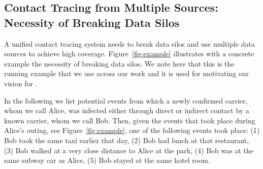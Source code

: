 \subsection{Contact Tracing from Multiple Sources: Necessity of Breaking Data Silos}
\label{bds}

A unified contact tracing system needs to break data silos and use multiple data sources to achieve high coverage. Figure~\ref{fig:example} illustrates with a concrete example the necessity of breaking data silos. We note here that this is the running example that we use across our work and it is used for motivating our vision for \sysname.

\begin{figure*}[t!]
	\centering
	\caption{Real-world example of contact tracing based on Alice's outing.}
	\label{fig:example}	
\end{figure*}

In the following we list potential events from which a newly confirmed carrier, whom we call Alice, was infected either through direct or indirect contact by a known carrier, whom we call Bob.
Then, given the events that took place during Alice's outing, see Figure~\ref{fig:example}, one of the following events took place: (1) Bob took the same taxi earlier that day, (2) Bob had lunch at that restaurant, (3) Bob walked at a very close distance to Alice at the park, (4) Bob was at the same subway car as Alice, (5) Bob stayed at the same hotel room.

